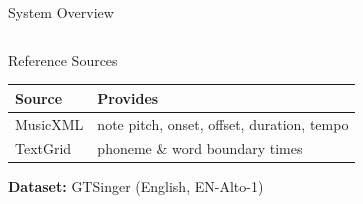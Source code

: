 \documentclass[aspectratio=169,9pt]{beamer}
\begin{document}
\begin{frame}{System Overview}
\begin{columns}[T]
      \begin{block}{Reference Sources}
        \small
        \renewcommand{\arraystretch}{1.15}
        \begin{tabular}{@{}ll@{}}
          \toprule
          Source   & Provides \\
          \midrule
          MusicXML & note pitch, onset, offset, duration, tempo \\
          TextGrid & phoneme \& word boundary times \\
          \bottomrule
        \end{tabular}
        \medskip\par
        \textbf{Dataset:} GTSinger (English, EN-Alto-1)
      \end{block}
  \end{columns}
\end{frame}
\end{document}
